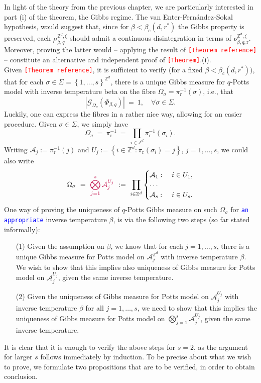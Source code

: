 \documentclass[12pt]{article}
\newcommand{\A}{\mathcal{A}}
\newcommand{\G}{\mathcal{G}}
\renewcommand{\r}{\mathrm{r}}
\newcommand{\Z}{\mathbb{Z}}
\newcommand{\set}[1]{\left\{#1\right\}}
\newcommand{\1}{\mathbbm{1}}
\newcommand{\5}{\vspace{0.5cm}}
\theoremstyle{definition}
\begin{document}
In light of the theory from the previous chapter, we are particularly interested in part (i) of the theorem, the Gibbs regime. The van Enter-Fern\'andez-Sokal hypothesis, would suggest that, since for $\beta<\beta_c(d,r^*)$ the Gibbs property is preserved, each $\mu_{\beta,q}^{\Z^d,\xi}$ should admit a continuous disintegration in terms of $\nu_{\beta,q,\r}^{\Z^d,\xi}$. Moreover, proving the latter would -- applying the result of \textcolor{red}{\texttt{[theorem reference]}} -- constitute an alternative and independent proof of \textcolor{red}{\texttt{[Theorem]}}.(i). \\

Given \textcolor{red}{\texttt{[Theorem reference]}}, it is sufficient to verify (for a fixed $\beta<\beta_c(d,r^*))$, that for each $\sigma\in\Sigma=\set{1,\ldots,s}^{\Z^d}$, there is a unique Gibbs measure for $q$-Potts model with inverse temperature beta on the fibre $\Omega_\sigma=\pi_\r^{-1}(\sigma)$, i.e., that
$$|\G_{\Omega_\sigma}(\Phi_{\beta,q})| ~=~ 1, \quad \forall \sigma\in\Sigma.$$
Luckily, one can express the fibres in a rather nice way, allowing for an easier procedure. Given $\sigma\in\Sigma$, we simply have
$$\Omega_\sigma ~=~ \pi_{\r}^{-1} ~=~ \prod_{i\in\Z^d}\pi_{\r}^{-1}(\sigma_i).$$
Writing $\A_j:=\pi_{\r}^{-1}(j)$ and $U_j:=\set{i\in\Z^d:\pi_{\r}(\sigma_i)=j}$, $j=1,\ldots,s$, we could also write
$$\Omega_\sigma ~=~ \textcolor{purple}{\bigotimes_{j=1}^s\A_j^{U_j}} ~:=~ \prod_{i\in\Z^d}\begin{cases}\A_1:~&i\in U_1,\\
\cdots\\
\A_s:~&i\in U_s.\end{cases}$$
One way of proving the uniqueness of $q$-Potts Gibbs measure on such $\Omega_\sigma$ for \textcolor{blue}{\texttt{an appropriate}} inverse temperature $\beta$, is via the following two steps (so far stated informally):
\begin{itemize}
	\item[(1)] Given the assumption on $\beta$, we know that for each $j=1,\ldots,s$, there is a unique Gibbs measure for Potts model on $\A_j^{\Z^d}$ with inverse temperature $\beta$. We wish to show that this implies also uniqueness of Gibbs measure for Potts model on $\A_j^{U_j}$, given the same inverse temperature.
	\item[(2)] Given the uniqueness of Gibbs measure for Potts model on $\A_j^{U_j}$ with inverse temperature $\beta$ for all $j=1,\ldots,s$, we need to show that this implies the uniqueness of Gibbs measure for Potts model on $\bigotimes_{j=1}^s \A_j^{U_j}$, given the same inverse temperature.
\end{itemize}
It is clear that it is enough to verify the above steps for $s=2$, as the argument for larger $s$ follows immediately by induction. To be precise about what we wish to prove, we formulate two propositions that are to be verified, in order to obtain conclusion.
\end{document}
